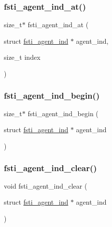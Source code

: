 \subsubsection{\texorpdfstring{fsti\+\_\+agent\+\_\+ind\+\_\+at()}{fsti\_agent\_ind\_at()}}
{\footnotesize\ttfamily size\+\_\+t$\ast$ fsti\+\_\+agent\+\_\+ind\+\_\+at (\begin{DoxyParamCaption}\item[{struct \mbox{\hyperlink{structfsti__agent__ind}{fsti\+\_\+agent\+\_\+ind}} $\ast$}]{agent\+\_\+ind,  }\item[{size\+\_\+t}]{index }\end{DoxyParamCaption})}

\mbox{\label{fsti-agent_8h_af8ec082c043d0719f2933f78c9b74879}} 
\subsubsection{\texorpdfstring{fsti\+\_\+agent\+\_\+ind\+\_\+begin()}{fsti\_agent\_ind\_begin()}}
{\footnotesize\ttfamily size\+\_\+t$\ast$ fsti\+\_\+agent\+\_\+ind\+\_\+begin (\begin{DoxyParamCaption}\item[{struct \mbox{\hyperlink{structfsti__agent__ind}{fsti\+\_\+agent\+\_\+ind}} $\ast$}]{agent\+\_\+ind }\end{DoxyParamCaption})}

\mbox{\label{fsti-agent_8h_a6ea0014798a460e51b30b2d8af0dda25}} 
\subsubsection{\texorpdfstring{fsti\+\_\+agent\+\_\+ind\+\_\+clear()}{fsti\_agent\_ind\_clear()}}
{\footnotesize\ttfamily void fsti\+\_\+agent\+\_\+ind\+\_\+clear (\begin{DoxyParamCaption}\item[{struct \mbox{\hyperlink{structfsti__agent__ind}{fsti\+\_\+agent\+\_\+ind}} $\ast$}]{agent\+\_\+ind }\end{DoxyParamCaption})}

